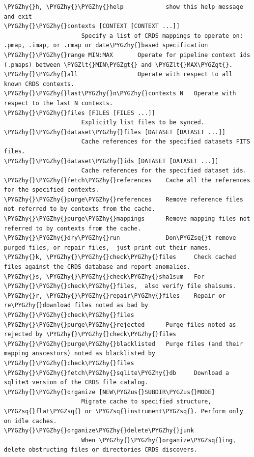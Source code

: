 \documentclass[letterpaper,10pt,english]{sphinxmanual}
\def\PYGZus{\char`\_}
\def\PYGZlt{\char`\<}
\def\PYGZgt{\char`\>}
\def\PYGZhy{\char`\-}
\def\PYGZsq{\char`\'}
\begin{document}
\begin{Verbatim}[commandchars=\\\{\}]
\PYGZhy{}h, \PYGZhy{}\PYGZhy{}help            show this help message and exit
\PYGZhy{}\PYGZhy{}contexts [CONTEXT [CONTEXT ...]]
                      Specify a list of CRDS mappings to operate on: .pmap, .imap, or .rmap or date\PYGZhy{}based specification
\PYGZhy{}\PYGZhy{}range MIN:MAX       Operate for pipeline context ids (.pmaps) between \PYGZlt{}MIN\PYGZgt{} and \PYGZlt{}MAX\PYGZgt{}.
\PYGZhy{}\PYGZhy{}all                 Operate with respect to all known CRDS contexts.
\PYGZhy{}\PYGZhy{}last\PYGZhy{}n\PYGZhy{}contexts N   Operate with respect to the last N contexts.
\PYGZhy{}\PYGZhy{}files [FILES [FILES ...]]
                      Explicitly list files to be synced.
\PYGZhy{}\PYGZhy{}dataset\PYGZhy{}files [DATASET [DATASET ...]]
                      Cache references for the specified datasets FITS files.
\PYGZhy{}\PYGZhy{}dataset\PYGZhy{}ids [DATASET [DATASET ...]]
                      Cache references for the specified dataset ids.
\PYGZhy{}\PYGZhy{}fetch\PYGZhy{}references    Cache all the references for the specified contexts.
\PYGZhy{}\PYGZhy{}purge\PYGZhy{}references    Remove reference files not referred to by contexts from the cache.
\PYGZhy{}\PYGZhy{}purge\PYGZhy{}mappings      Remove mapping files not referred to by contexts from the cache.
\PYGZhy{}\PYGZhy{}dry\PYGZhy{}run             Don\PYGZsq{}t remove purged files, or repair files,  just print out their names.
\PYGZhy{}k, \PYGZhy{}\PYGZhy{}check\PYGZhy{}files     Check cached files against the CRDS database and report anomalies.
\PYGZhy{}s, \PYGZhy{}\PYGZhy{}check\PYGZhy{}sha1sum   For \PYGZhy{}\PYGZhy{}check\PYGZhy{}files,  also verify file sha1sums.
\PYGZhy{}r, \PYGZhy{}\PYGZhy{}repair\PYGZhy{}files    Repair or re\PYGZhy{}download files noted as bad by \PYGZhy{}\PYGZhy{}check\PYGZhy{}files
\PYGZhy{}\PYGZhy{}purge\PYGZhy{}rejected      Purge files noted as rejected by \PYGZhy{}\PYGZhy{}check\PYGZhy{}files
\PYGZhy{}\PYGZhy{}purge\PYGZhy{}blacklisted   Purge files (and their mapping anscestors) noted as blacklisted by \PYGZhy{}\PYGZhy{}check\PYGZhy{}files
\PYGZhy{}\PYGZhy{}fetch\PYGZhy{}sqlite\PYGZhy{}db     Download a sqlite3 version of the CRDS file catalog.
\PYGZhy{}\PYGZhy{}organize [NEW\PYGZus{}SUBDIR\PYGZus{}MODE]
                      Migrate cache to specified structure, \PYGZsq{}flat\PYGZsq{} or \PYGZsq{}instrument\PYGZsq{}. Perform only on idle caches.
\PYGZhy{}\PYGZhy{}organize\PYGZhy{}delete\PYGZhy{}junk
                      When \PYGZhy{}\PYGZhy{}organize\PYGZsq{}ing, delete obstructing files or directories CRDS discovers.

\end{Verbatim}
\end{document}
